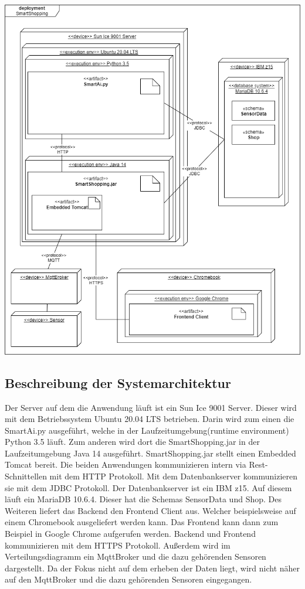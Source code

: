 \documentclass[runningheads]{llncs}
\begin{document}
\includegraphics[width=\linewidth]{images/deployment_diagram}


\subsection{Beschreibung der Systemarchitektur}


Der Server auf dem die Anwendung läuft ist ein Sun Ice 9001 Server.
Dieser wird mit dem Betriebssystem Ubuntu 20.04 LTS betrieben.
Darin wird zum einen die SmartAi.py ausgeführt, welche in der Laufzeitumgebung(runtime environment) Python 3.5 läuft.
Zum anderen wird dort die SmartShopping.jar in der Laufzeitumgebung Java 14 ausgeführt.
SmartShopping.jar stellt einen Embedded Tomcat bereit.
Die beiden Anwendungen kommunizieren intern via Rest-Schnittellen mit dem HTTP Protokoll.
Mit dem Datenbankserver kommunizieren sie mit dem JDBC Protokoll.
Der Datenbankserver ist ein IBM z15.
Auf diesem läuft ein MariaDB 10.6.4.
Dieser hat die Schemas SensorData und Shop.
Des Weiteren liefert das Backend den Frontend Client aus.
Welcher beispielsweise auf einem Chromebook ausgeliefert werden kann.
Das Frontend kann dann zum Beispiel in Google Chrome aufgerufen werden.
Backend und Frontend kommunizieren mit dem HTTPS Protokoll.
Außerdem wird im Verteilungsdiagramm ein MqttBroker und die dazu gehörenden Sensoren dargestellt.
Da der Fokus nicht auf dem erheben der Daten liegt, wird nicht näher auf den MqttBroker und die dazu gehörenden Sensoren eingegangen.
\end{document}
